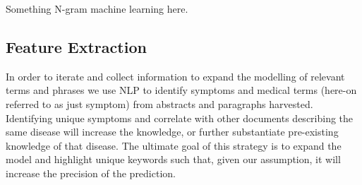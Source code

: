 \documentclass[10pt,letterpaper,draft]{article}
\begin{document}
Something N-gram machine learning here.

\subsection{Feature Extraction}
In order to iterate and collect information to expand the modelling of
relevant terms and phrases we use NLP to identify symptoms and medical
terms (here-on referred to as just symptom) from abstracts and
paragraphs harvested. Identifying unique symptoms and correlate with
other documents describing the same disease will increase the knowledge,
or further substantiate pre-existing knowledge of that disease. The
ultimate goal of this strategy is to expand the model and highlight
unique keywords such that, given our assumption, it will increase the
precision of the prediction.
\end{document}
